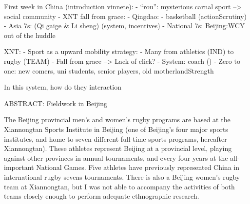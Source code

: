 First week in China (introduction vinnete):
- ``rou'': mysterious carnal sport --> social community
- XNT fall from grace:
- Qingdao:
    - basketball (actionScrutiny)
    - Asia 7s: (Qi gaige & Li sheng) (system, incentives)
    - National 7s: Beijing:WCY out of the huddle


XNT:
- Sport as a upward mobility strategy:
    - Many from athletics (IND) to rugby (TEAM)
- Fall from grace --> Lack of click?
- System: coach ()
- Zero to one: new comers, uni students, senior players, old motherlandStrength

In this system, how do they interaction

ABSTRACT:
Fieldwork in Beijing



The Beijing provincial men's and women's rugby programs are based at the Xiannongtan Sports Institute in Beijing (one of Beijing's four major sports institutes, and home to seven different full-time sports programs, hereafter Xiannongtan).  These athletes represent Beijing at a provincial level, playing against other provinces in annual tournaments, and every four years at the all-important National Games.  Five athletes have previously represented China in international rugby sevens tournaments.  There is also a Beijing women's rugby team at Xiannongtan, but I was not able to accompany the activities of both teams closely enough to perform adequate ethnographic research.
